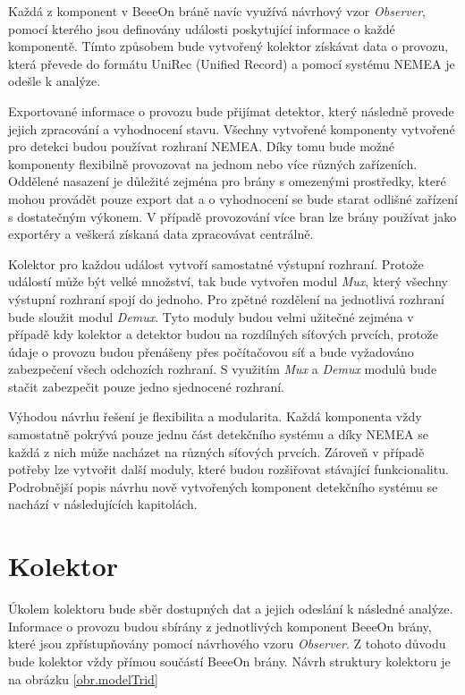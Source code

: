  Každá z komponent v BeeeOn bráně navíc využívá návrhový vzor \textit{Observer}, pomocí kterého jsou
 definovány události poskytující informace o každé komponentě. 
 Tímto způsobem bude vytvořený kolektor získávat data o provozu, která
 převede do formátu UniRec (Unified Record) a pomocí systému NEMEA je odešle k analýze.
 
 Exportované informace o provozu bude přijímat detektor, který následně provede jejich zpracování a 
 vyhodnocení stavu. Všechny vytvořené komponenty vytvořené pro detekci budou používat rozhraní 
 NEMEA. Díky tomu bude možné komponenty flexibilně provozovat na jednom nebo více různých zařízeních.
 Oddělené nasazení je důležité zejména pro brány s omezenými prostředky, které mohou provádět 
 pouze export dat a o vyhodnocení se bude starat odlišné zařízení s dostatečným výkonem. V případě 
 provozování více bran lze brány používat jako exportéry a veškerá získaná data zpracovávat 
 centrálně. 
 
 Kolektor pro každou událost vytvoří samostatné výstupní rozhraní. Protože událostí může být 
 velké množství, tak bude vytvořen modul \textit{Mux}, který všechny výstupní rozhraní spojí do jednoho. 
 Pro zpětné rozdělení na jednotlivá rozhraní bude sloužit modul \textit{Demux}. Tyto moduly budou velmi užitečné
 zejména v případě kdy kolektor a detektor budou na rozdílných síťových prvcích, protože údaje 
 o provozu budou přenášeny přes počítačovou síť a bude vyžadováno zabezpečení všech odchozích
 rozhraní. S využitím \textit{Mux} a \textit{Demux} modulů bude stačit zabezpečit pouze jedno sjednocené rozhraní. 
 
 Výhodou návrhu řešení je flexibilita a modularita. Každá komponenta vždy samostatně pokrývá pouze jednu
 část detekčního systému a díky NEMEA se každá z nich může nacházet na různých síťových prvcích. Zároveň
 v případě potřeby lze vytvořit další moduly, které budou rozšiřovat stávající funkcionalitu.
 Podrobnější popis návrhu nově vytvořených komponent detekčního systému se nachází v následujících kapitolách.
 
 \section{Kolektor}
 Úkolem kolektoru bude sběr dostupných dat a jejich odeslání k následné analýze. Informace o 
 provozu budou sbírány z jednotlivých komponent BeeeOn brány, které jsou zpřístupňovány pomocí 
 návrhového vzoru \textit{Observer}. Z tohoto důvodu bude kolektor vždy přímou součástí BeeeOn brány. 
 Návrh struktury kolektoru je na obrázku \ref{obr.modelTrid}
 

